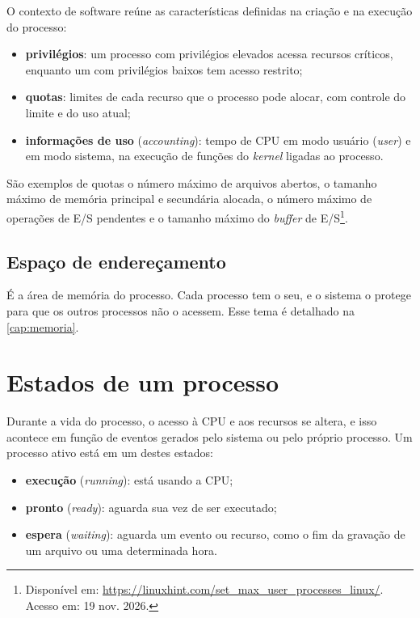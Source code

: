 O contexto de software reúne as características definidas na criação e na execução do processo:
\begin{itemize}
  \item \textbf{privilégios}: um processo com privilégios elevados acessa recursos críticos, enquanto um com privilégios baixos tem acesso restrito;
  \item \textbf{quotas}: limites de cada recurso que o processo pode alocar, com controle do limite e do uso atual;
  \item \textbf{informações de uso} (\textit{accounting}): tempo de CPU em modo usuário (\textit{user}) e em modo sistema, na execução de funções do \textit{kernel} ligadas ao processo.
\end{itemize}
São exemplos de quotas o número máximo de arquivos abertos, o tamanho máximo de memória principal e secundária alocada, o número máximo de operações de E/S pendentes e o tamanho máximo do \textit{buffer} de E/S\footnote{Disponível em: \url{https://linuxhint.com/set_max_user_processes_linux/}. Acesso em: 19 nov. 2026.}.

\subsection{Espaço de endereçamento}

É a área de memória do processo. Cada processo tem o seu, e o sistema o protege para que os outros processos não o acessem. Esse tema é detalhado na \autoref{cap:memoria}.

\section{Estados de um processo}

Durante a vida do processo, o acesso à CPU e aos recursos se altera, e isso acontece em função de eventos gerados pelo sistema ou pelo próprio processo. Um processo ativo está em um destes estados:

\begin{itemize}
  \item \textbf{execução} (\textit{running}): está usando a CPU;
  \item \textbf{pronto} (\textit{ready}): aguarda sua vez de ser executado;
  \item \textbf{espera} (\textit{waiting}): aguarda um evento ou recurso, como o fim da gravação de um arquivo ou uma determinada hora.
\end{itemize}

